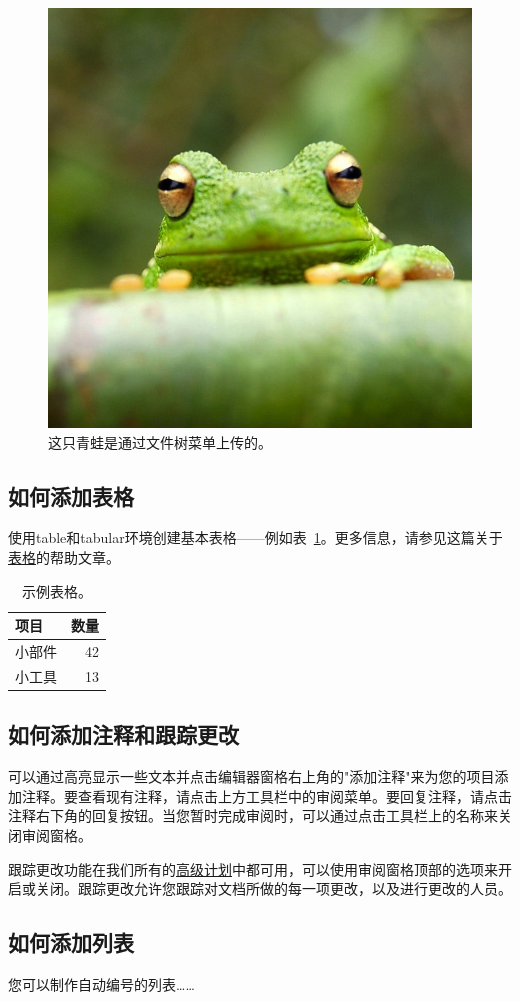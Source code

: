\documentclass{article}
\begin{document}
\begin{figure}[H]
      \centering
      \includegraphics[width=0.25\linewidth]{frog.jpg}
      \caption{\label{fig:frog}这只青蛙是通过文件树菜单上传的。}
\end{figure}

\subsection{如何添加表格}

使用table和tabular环境创建基本表格——例如表~\ref{tab:widgets}。更多信息，请参见这篇关于\href{https://www.overleaf.com/learn/latex/tables}{表格}的帮助文章。

\begin{table}[H]
      \centering
      \begin{tabular}{l|r}
            项目  & 数量 \\\hline
            小部件 & 42 \\
            小工具 & 13
      \end{tabular}
      \caption{\label{tab:widgets}示例表格。}
\end{table}

\subsection{如何添加注释和跟踪更改}

可以通过高亮显示一些文本并点击编辑器窗格右上角的"添加注释"来为您的项目添加注释。要查看现有注释，请点击上方工具栏中的审阅菜单。要回复注释，请点击注释右下角的回复按钮。当您暂时完成审阅时，可以通过点击工具栏上的名称来关闭审阅窗格。

跟踪更改功能在我们所有的\href{https://www.overleaf.com/user/subscription/plans}{高级计划}中都可用，可以使用审阅窗格顶部的选项来开启或关闭。跟踪更改允许您跟踪对文档所做的每一项更改，以及进行更改的人员。

\subsection{如何添加列表}

您可以制作自动编号的列表……
\end{document}
